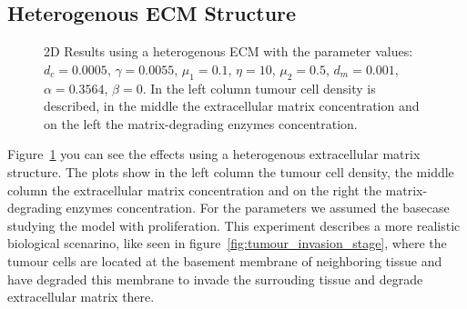 \subsection{Heterogenous ECM Structure}
\begin{figure}[h]
    \centering
    \caption{2D Results using a heterogenous ECM with the parameter values: $d_c=0.0005$, $\gamma=0.0055$, $\mu_1 = 0.1$, $\eta=10$, $\mu_2=0.5$, $d_m = 0.001$, $\alpha = 0.3564$, $\beta = 0$. In the left column tumour cell density is described, in the middle the extracellular matrix concentration and on the left the matrix-degrading enzymes concentration.}
    \label{fig:2D_heterogenous_ECM}
\end{figure}
Figure~\ref{fig:2D_heterogenous_ECM} you can see the effects using a heterogenous extracellular matrix structure. The plots show in the left column the tumour cell density, the middle column the extracellular matrix concentration and on the right the matrix-degrading enzymes concentration. For the parameters we assumed the basecase studying the model with proliferation. \newline
This experiment describes a more realistic biological scenarino, like seen in figure~\ref{fig:tumour_invasion_stage}, where the tumour cells are located at the basement membrane of neighboring tissue and have degraded this membrane to invade the surrouding tissue and degrade extracellular matrix there.\newline

